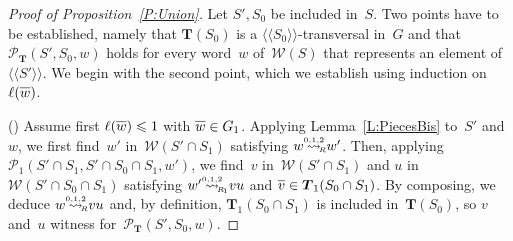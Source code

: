 \documentclass{amsart}
\numberwithin{equation}{section}
\theoremstyle{plain}
\theoremstyle{definition}
\newcounter{ITEM}
\let\le=\leqslant
\begin{document}
\begin{proof}[Proof of Proposition~\ref{P:Union}]
Let ${S}', {S}_0$ be included in~${S}$. Two points have to be established, namely that ${\boldsymbol{T}}({S}_0)$ is a ${\langle\!\langle{{{S}_0}}\rangle\!\rangle}$-transversal in~${G}$ and that ${\mathcal{P}}_{\boldsymbol{T}}({S}', {S}_0, {w})$ holds for every word~${w}$ of~${\mathcal{W}({S})}$ that represents an element of~${\langle\!\langle{{{S}'}}\rangle\!\rangle}$. We begin with the second point, which we establish using induction on~${\ell({{\overline{\vrule width0pt height5pt{w}}}})}$. 

{\setcounter{ITEM}{1}\leavevmode\hbox{\rm()}} Assume first ${\ell({{\overline{\vrule width0pt height5pt{w}}}})} \le 1$ with ${\overline{\vrule width0pt height5pt{w}}} \in {G}_1$. Applying Lemma~\ref{L:PiecesBis} to~${S}'$ and~${w}$, we first find~${w}'$ in~${\mathcal{W}({{S}' \cap {S}_1})}$ satisfying ${w} {\mathrel{{\mathrel{\overset{\scriptscriptstyle 0,1,2}{\rightsquigarrow}}}_{\hspace{-0.9ex}{\scriptscriptstyle R}}}} {w}'$. Then, applying~${\mathcal{P}_{1}({{S}' \cap {S}_1}, {{S}' \cap {S}_0 \cap {S}_1}, {{w}'})}$, we find~${v}$ in~${\mathcal{W}({{S}' \cap {S}_1})}$ and ${u}$ in~${\mathcal{W}({{S}' \cap {S}_0 \cap {S}_1})}$ satisfying ${w}' {\mathrel{{\mathrel{\overset{\scriptscriptstyle 0,1,2}{\rightsquigarrow}}}_{\hspace{-0.9ex}{\scriptscriptstyle R}_{\hspace{-0.2ex}1}}}} {v} {u}$ and ${\overline{\vrule width0pt height5pt{v}}} \in {\boldsymbol{T}}_1({S}_0 \cap {S}_1)$. By composing, we deduce ${w} {\mathrel{{\mathrel{\overset{\scriptscriptstyle 0,1,2}{\rightsquigarrow}}}_{\hspace{-0.9ex}{\scriptscriptstyle R}}}} {v} {u}$ and, by definition, ${\boldsymbol{T}}_1({S}_0 \cap {S}_1)$ is included in~${\boldsymbol{T}}({S}_0)$, so ${v}$ and~${u}$ witness for~${\mathcal{P}}_{\boldsymbol{T}}({S}', {S}_0, {w})$.


\end{proof}
\end{document}
